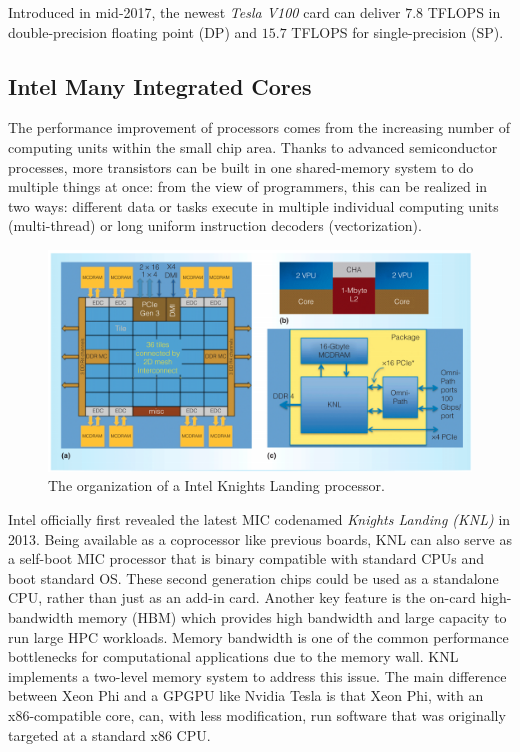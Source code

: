 Introduced in mid-2017, the newest \textit{Tesla V100} card can deliver $7.8$ TFLOPS in double-precision floating point (DP) and $15.7$ TFLOPS for single-precision (SP).

\subsection{Intel Many Integrated Cores}

The performance improvement of processors comes from the increasing number of computing units within the small chip area. Thanks to advanced semiconductor processes, more transistors can be built in one shared-memory system to do multiple things at once: from the view of programmers, this can be realized in two ways: different data or tasks execute in multiple individual computing units (multi-thread) or long uniform instruction decoders (vectorization).

\begin{figure}[htbp]
	\centering
	\includegraphics[width=0.99\linewidth]{fig/KNL1.png}
	\caption{The organization of a Intel Knights Landing processor.}
	\label{knl1}
\end{figure}

Intel officially first revealed the latest MIC codenamed \textit{Knights Landing (KNL)} in 2013. Being available as a coprocessor like previous boards, KNL can also serve as a self-boot MIC processor that is binary compatible with standard CPUs and boot standard OS. These second generation chips could be used as a standalone CPU, rather than just as an add-in card. Another key feature is the on-card high-bandwidth memory (HBM) which provides high bandwidth and large capacity to run large HPC workloads. Memory bandwidth is one of the common performance bottlenecks for computational applications due to the memory wall. KNL implements a two-level memory system to address this issue. The main difference between Xeon Phi and a GPGPU like Nvidia Tesla is that Xeon Phi, with an x86-compatible core, can, with less modification, run software that was originally targeted at a standard x86 CPU.

